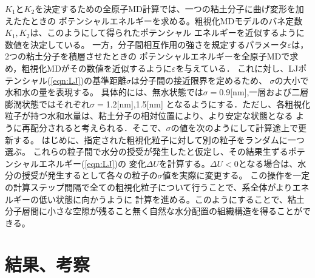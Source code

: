 ﻿\documentclass[11pt,a4j]{jarticle}
\begin{document}
$K_1$と$K_2$を決定するための全原子MD計算では、一つの粘土分子に曲げ変形を加えたたときの
ポテンシャルエネルギーを求める。粗視化MDモデルのバネ定数$K_1, K_2$は、このようにして得られたポテンシャル
エネルギーを近似するように数値を決定している。
一方，分子間相互作用の強さを規定するパラメータ$\varepsilon$は，2つの粘土分子を積層させたときの
ポテンシャルエネルギーを全原子MDで求め，粗視化MDがその数値を近似するように$\varepsilon$を与えている．
これに対し、LJポテンシャル(\ref{eqn:LJ})の基準距離$\sigma$は分子間の接近限界を定めるため、
$\sigma$の大小で水和水の量を表現する。
具体的には、無水状態では$\sigma=$0.9[nm],一層および二層膨潤状態ではそれぞれ$\sigma=$1.2[nm],1.5[nm]
となるようにする．ただし、各粗視化粒子が持つ水和水量は、粘土分子の相対位置により、より安定な状態となる
ように再配分されると考えられる．そこで、$\sigma$の値を次のようにして計算途上で更新する。
はじめに、指定された粗視化粒子に対して別の粒子をランダムに一つ選ぶ。
これらの粒子間で水分の授受が発生したと仮定し、その結果生ずるポテンシャルエネルギー(\ref{eqn:LJ})の
変化$\Delta U$を計算する。$\Delta U<0$となる場合は、水分の授受が発生するとして各々の粒子の$\sigma$値を実際に変更する。
この操作を一定の計算ステップ間隔で全ての粗視化粒子について行うことで、系全体がよりエネルギーの低い状態に向かうように
計算を進める。このようにすることで、粘土分子層間に小さな空隙が残ること無く自然な水分配置の組織構造を得ることができる。
\section{結果、考察}
\end{document}
